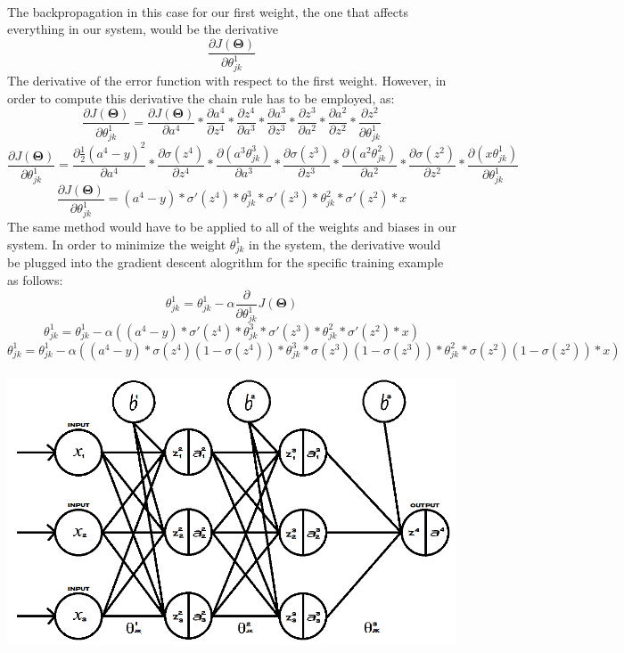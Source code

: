 \documentclass[a4paper,12pt]{article}
\begin{document}
\\ The backpropagation in this case for our first weight, the one that affects everything in our system, would be the derivative \[\frac{\partial J(\boldsymbol{\Theta})}{\partial \theta_{jk}^1}\] The derivative of the error function with respect to the first weight. However, in order to compute this derivative the chain rule has to be employed, as:
\[\frac{\partial J(\boldsymbol{\Theta})}{\partial \theta_{jk}^1} = \frac{\partial J(\boldsymbol{\Theta})}{\partial a^4} * \frac{\partial a^4}{\partial z^4} * \frac{\partial z^4}{\partial a^3} * \frac{\partial a^3}{\partial z^3} * \frac{\partial z^3}{\partial a^2} * \frac{\partial a^2}{\partial z^2} * \frac{\partial z^2}{\partial \theta^1_{jk}}\]
\[\frac{\partial J(\boldsymbol{\Theta})}{\partial \theta_{jk}^1} = \frac{\partial \frac{1}{2}(a^4 - y)^2}{\partial a^4} * \frac{\partial \sigma(z^4)}{\partial z^4} * \frac{\partial (a^3\theta^3_{jk})}{\partial a^3} * \frac{\partial \sigma(z^3)}{\partial z^3} * \frac{\partial (a^2\theta_{jk}^2)}{\partial a^2} * \frac{\partial \sigma(z^2)}{\partial z^2} * \frac{\partial (x\theta_{jk}^1)}{\partial \theta_{jk}^1}\]
\[\frac{\partial J(\boldsymbol{\Theta})}{\partial \theta_{jk}^1} = (a^4 - y) * \sigma'(z^4) * \theta_{jk}^3 * \sigma'(z^3) * \theta_{jk}^2 * \sigma'(z^2) * x\]
The same method would have to be applied to all of the weights and biases in our system. In order to minimize the weight $\theta_{jk}^1$ in the system, the derivative would be plugged into the gradient descent alogrithm for the specific training example as follows:
 \[\theta_{jk}^1 = \theta_{jk}^1 - \alpha \frac{\partial}{\partial\theta_{jk}^1} J(\boldsymbol{\Theta})\]
\[\theta_{jk}^1 = \theta_{jk}^1 - \alpha ((a^4 - y) * \sigma'(z^4) * \theta_{jk}^3 * \sigma'(z^3) * \theta_{jk}^2 * \sigma'(z^2) * x)\]
\[\theta_{jk}^1 = \theta_{jk}^1 - \alpha ((a^4 - y) * \sigma(z^4)(1-\sigma(z^4)) * \theta_{jk}^3 * \sigma(z^3)(1-\sigma(z^3)) * \theta_{jk}^2 * \sigma(z^2)(1-\sigma(z^2)) * x)\]
\\
\includegraphics[scale=0.548]{multidimension}
\end{document}
